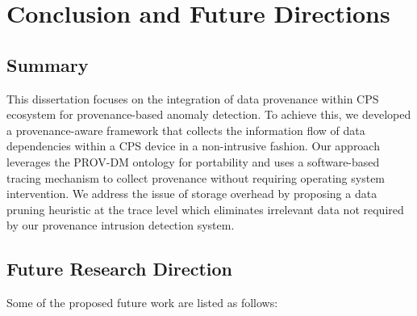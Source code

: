\chapter{Conclusion and Future Directions}


\section{Summary}
This dissertation focuses on the integration of data provenance within CPS ecosystem for provenance-based anomaly detection. To achieve this, we developed a provenance-aware framework that collects the information flow of data dependencies within a CPS device in a non-intrusive fashion. Our approach leverages the PROV-DM ontology for portability and uses a software-based tracing mechanism to collect provenance without requiring operating system intervention. We address the issue of storage overhead by proposing a data pruning heuristic at the trace level which eliminates irrelevant data not required by our provenance intrusion detection system. 



\section{Future Research Direction}

Some of the proposed future work are listed as follows:

